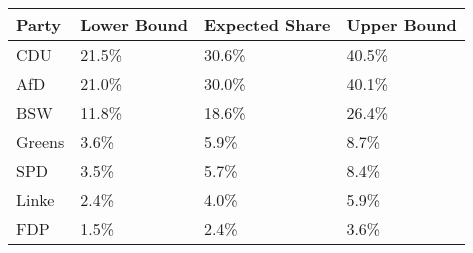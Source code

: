 \begin{tabular}{llll}
  \hline
Party & Lower Bound & Expected Share & Upper Bound \\ 
  \hline
CDU & 21.5\% & 30.6\% & 40.5\% \\ 
  AfD & 21.0\% & 30.0\% & 40.1\% \\ 
  BSW & 11.8\% & 18.6\% & 26.4\% \\ 
  Greens & 3.6\% & 5.9\% & 8.7\% \\ 
  SPD & 3.5\% & 5.7\% & 8.4\% \\ 
  Linke & 2.4\% & 4.0\% & 5.9\% \\ 
  FDP & 1.5\% & 2.4\% & 3.6\% \\ 
   \hline
\end{tabular}
